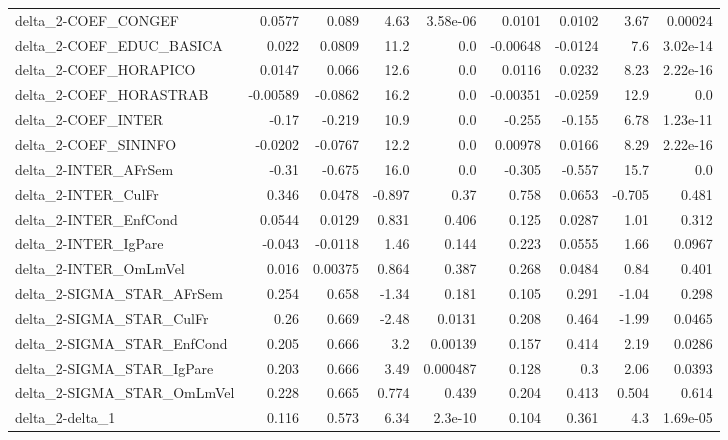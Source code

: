 \begin{tabular}{lrrrrrrrr}
delta\_2-COEF\_CONGEF                   &      0.0577 &        0.089 &    4.63 & 3.58e-06 &     0.0101 &      0.0102 &         3.67 &       0.00024 \\
delta\_2-COEF\_EDUC\_BASICA              &       0.022 &       0.0809 &    11.2 &      0.0 &   -0.00648 &     -0.0124 &          7.6 &      3.02e-14 \\
delta\_2-COEF\_HORAPICO                 &      0.0147 &        0.066 &    12.6 &      0.0 &     0.0116 &      0.0232 &         8.23 &      2.22e-16 \\
delta\_2-COEF\_HORASTRAB                &    -0.00589 &      -0.0862 &    16.2 &      0.0 &   -0.00351 &     -0.0259 &         12.9 &           0.0 \\
delta\_2-COEF\_INTER                    &       -0.17 &       -0.219 &    10.9 &      0.0 &     -0.255 &      -0.155 &         6.78 &      1.23e-11 \\
delta\_2-COEF\_SININFO                  &     -0.0202 &      -0.0767 &    12.2 &      0.0 &    0.00978 &      0.0166 &         8.29 &      2.22e-16 \\
delta\_2-INTER\_AFrSem                  &       -0.31 &       -0.675 &    16.0 &      0.0 &     -0.305 &      -0.557 &         15.7 &           0.0 \\
delta\_2-INTER\_CulFr                   &       0.346 &       0.0478 &  -0.897 &     0.37 &      0.758 &      0.0653 &       -0.705 &         0.481 \\
delta\_2-INTER\_EnfCond                 &      0.0544 &       0.0129 &   0.831 &    0.406 &      0.125 &      0.0287 &         1.01 &         0.312 \\
delta\_2-INTER\_IgPare                  &      -0.043 &      -0.0118 &    1.46 &    0.144 &      0.223 &      0.0555 &         1.66 &        0.0967 \\
delta\_2-INTER\_OmLmVel                 &       0.016 &      0.00375 &   0.864 &    0.387 &      0.268 &      0.0484 &         0.84 &         0.401 \\
delta\_2-SIGMA\_STAR\_AFrSem             &       0.254 &        0.658 &   -1.34 &    0.181 &      0.105 &       0.291 &        -1.04 &         0.298 \\
delta\_2-SIGMA\_STAR\_CulFr              &        0.26 &        0.669 &   -2.48 &   0.0131 &      0.208 &       0.464 &        -1.99 &        0.0465 \\
delta\_2-SIGMA\_STAR\_EnfCond            &       0.205 &        0.666 &     3.2 &  0.00139 &      0.157 &       0.414 &         2.19 &        0.0286 \\
delta\_2-SIGMA\_STAR\_IgPare             &       0.203 &        0.666 &    3.49 & 0.000487 &      0.128 &         0.3 &         2.06 &        0.0393 \\
delta\_2-SIGMA\_STAR\_OmLmVel            &       0.228 &        0.665 &   0.774 &    0.439 &      0.204 &       0.413 &        0.504 &         0.614 \\
delta\_2-delta\_1                       &       0.116 &        0.573 &    6.34 &  2.3e-10 &      0.104 &       0.361 &          4.3 &      1.69e-05 \\
\bottomrule
\end{tabular}
